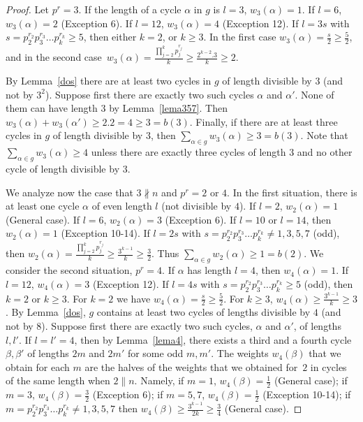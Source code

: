 \documentclass[ALCO,published]{cedram}
\renewcommand{\sigma}{g}
\begin{document}
\begin{proof}
Let $p^r=3$. If the length of a cycle $\alpha$ in $g$ is $l=3$, $w_3(\alpha)=1$. If $l=6$, $w_3(\alpha)=2$ (Exception 6). If $l=12$, $w_3(\alpha)=4$ (Exception 12). If $l=3s$ with $s=p_2^{r_2}p_3^{r_3}\ldots p_k^{r_k}\ge 5$, then either $k=2$, or $k\ge 3$. In the first case $w_3(\alpha)=\frac{s}{2}\ge \frac{5}{2}$, and in the second case~$w_3(\alpha)=\frac{\prod\limits_{j=2}^k p_j^{r_j}}{k}\ge \frac{2^{k-2}.3}{k}\ge 2$.

By Lemma~\ref{dos} there are at least two cycles in $\sigma$ of length divisible by $3$ (and not by $3^2$). Suppose first there are exactly two such cycles $\alpha$ and $\alpha'$. None of them can have length $3$ by Lemma~\ref{lema357}. Then $w_3(\alpha)+w_3(\alpha')\ge 2.2=4\ge 3=b(3)$. Finally, if there are at least three cycles in $\sigma$ of length divisible by $3$, then $\sum\limits_{\alpha \in \sigma} w_{3}(\alpha)\ge 3= b(3)$. Note that $\sum\limits_{\alpha \in \sigma} w_{3}(\alpha)\ge 4$ unless there are exactly three cycles of length $3$ and no other cycle of length divisible by $3$.

We analyze now the case that $3\nparallel n$ and $p^r=2$ or $4$. In the first situation, there is at least one cycle $\alpha$ of even length $l$ (not divisible by $4$). If $l=2$, $w_2(\alpha)=1$ (General case). If $l=6$, $w_2(\alpha)=3$ (Exception 6). If $l=10$ or $l=14$, then $w_2(\alpha)=1$ (Exception 10-14). If $l=2s$ with $s=p_2^{r_2}p_3^{r_3}\ldots p_k^{r_k}\neq 1,3,5,7$ (odd), then $w_2(\alpha)=\frac{\prod\limits_{j=2}^k p_j^{r_j}}{k}\ge \frac{3^{k-1}}{k}\ge \frac{3}{2}$. Thus $\sum\limits_{\alpha \in \sigma} w_{2}(\alpha)\ge 1= b(2)$. We consider the second situation, $p^r=4$. If $\alpha$ has length $l=4$, then $w_4(\alpha)=1$. If $l=12$, $w_4(\alpha)=3$ (Exception 12). If $l=4s$ with $s=p_2^{r_2}p_3^{r_3}\ldots p_k^{r_k}\ge 5$ (odd), then $k=2$ or $k\ge 3$. For $k=2$ we have $w_4(\alpha)=\frac{s}{2}\ge \frac{5}{2}$. For $k\ge 3$, $w_4(\alpha)\ge \frac{3^{k-1}}{k}\ge 3$. By Lemma~\ref{dos}, $\sigma$ contains at least two cycles of lengths divisible by $4$ (and not by $8$). Suppose first there are exactly two such cycles, $\alpha$ and $\alpha'$, of lengths $l,l'$. If $l=l'=4$, then by Lemma~\ref{lema4}, there exists a third and a fourth cycle $\beta, \beta'$ of lengths $2m$ and $2m'$ for some odd $m,m'$. The weights $w_4(\beta)$ that we obtain for each $m$ are the halves of the weights that we obtained for~$2$ in cycles of the same length when $2\parallel n$. Namely, if $m=1$, $w_4(\beta)=\frac{1}{2}$ (General case); if $m=3$, $w_4(\beta)=\frac{3}{2}$ (Exception 6); if $m=5,7$, $w_4(\beta)=\frac{1}{2}$ (Exception 10-14); if $m=p_2^{r_2}p_3^{r_3}\ldots p_k^{r_k}\neq 1,3,5,7$ then $w_4(\beta)\ge \frac{3^{k-1}}{2k}\ge \frac{3}{4}$ (General case).


\end{proof}
\end{document}
